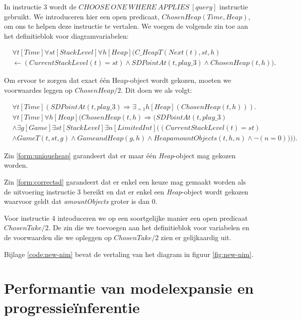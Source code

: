 In instructie 3 wordt de $CHOOSE\ ONE\ WHERE\ APPLIES\ [query]$ instructie gebruikt. We introduceren hier een open predicaat, $ChosenHeap(Time, Heap)$, om ons te helpen deze instructie te vertalen. We voegen de volgende zin toe aan het definitieblok voor diagramvariabelen:

\begin{align}
\nonumber &\forall{t}[Time]\forall{st}[StackLevel]\forall{h}[Heap](C\_HeapT(Next(t), st, h) \\ &\leftarrow (CurrentStackLevel(t) = st) \land SDPointAt(t, play\_3) \land ChosenHeap(t, h)).
\end{align}

Om ervoor te zorgen dat exact \'e\'en Heap-object wordt gekozen, moeten we voorwaardes leggen op $ChosenHeap/2$. Dit doen we als volgt:

\begin{align}
&\forall{t}[Time](SDPointAt(t, play\_3) \Rightarrow \exists_{=1}{h}[Heap](ChosenHeap(t, h))).\label{form:uniqueheap} \\
\nonumber &\forall{t}[Time]\forall{h}[Heap](ChosenHeap(t, h) \Rightarrow (SDPointAt(t, play\_3) \\ \nonumber &\land \exists{g}[Game]\exists{st}[StackLevel]\exists{n}[LimitedInt]((CurrentStackLevel(t) = st) \\ &\land GameT(t, st, g) \land GameandHeap(g, h) \land HeapamountObjects(t, h, n) \land \lnot(n = 0)))).\label{form:correctsd}
\end{align}

Zin \ref{form:uniqueheap} garandeert dat er maar \'e\'en \textit{Heap}-object mag gekozen worden.

Zin \ref{form:correctsd} garandeert dat er enkel een keuze mag gemaakt worden als de uitvoering instructie 3 bereikt en dat er enkel een \textit{Heap}-object wordt gekozen waarvoor geldt dat \textit{amountObjects} groter is dan 0.

Voor instructie 4 introduceren we op een soortgelijke manier een open predicaat $ChosenTake/2$. De zin die we toevoegen aan het definitieblok voor variabelen en de voorwaarden die we opleggen op $ChosenTake/2$ zien er gelijkaardig uit.

Bijlage \ref{code:new-nim} bevat de vertaling van het diagram in figuur \ref{fig:new-nim}.

\section{Performantie van modelexpansie en progressie\"inferentie}

